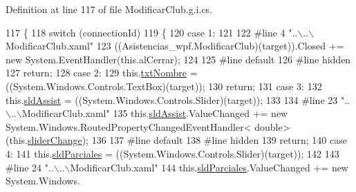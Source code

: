 Definition at line 117 of file Modificar\-Club.\-g.\-i.\-cs.


\begin{DoxyCode}
117                                                                                                 \{
118             \textcolor{keywordflow}{switch} (connectionId)
119             \{
120             \textcolor{keywordflow}{case} 1:
121             
122 \textcolor{preprocessor}{            #line 4 "..\(\backslash\)..\(\backslash\)ModificarClub.xaml"}
123 \textcolor{preprocessor}{}            ((Asistencias\_wpf.ModificarClub)(target)).Closed += \textcolor{keyword}{new} System.EventHandler(\textcolor{keyword}{this}.alCerrar);
124             
125 \textcolor{preprocessor}{            #line default}
126 \textcolor{preprocessor}{}\textcolor{preprocessor}{            #line hidden}
127 \textcolor{preprocessor}{}            \textcolor{keywordflow}{return};
128             \textcolor{keywordflow}{case} 2:
129             this.\hyperlink{class_asistencias__wpf_1_1_modificar_club_aefec4cf6adde6b83050acc590661f212}{txtNombre} = ((System.Windows.Controls.TextBox)(target));
130             \textcolor{keywordflow}{return};
131             \textcolor{keywordflow}{case} 3:
132             this.\hyperlink{class_asistencias__wpf_1_1_modificar_club_a10b87622ef3fad840bb25827b45b6fc6}{sldAssist} = ((System.Windows.Controls.Slider)(target));
133             
134 \textcolor{preprocessor}{            #line 23 "..\(\backslash\)..\(\backslash\)ModificarClub.xaml"}
135 \textcolor{preprocessor}{}            this.\hyperlink{class_asistencias__wpf_1_1_modificar_club_a10b87622ef3fad840bb25827b45b6fc6}{sldAssist}.ValueChanged += \textcolor{keyword}{new} System.Windows.RoutedPropertyChangedEventHandler<\textcolor{keywordtype}{
      double}>(this.\hyperlink{class_asistencias__wpf_1_1_modificar_club_a16e4ed6700460777f30a494ee9eb0680}{sliderChange});
136             
137 \textcolor{preprocessor}{            #line default}
138 \textcolor{preprocessor}{}\textcolor{preprocessor}{            #line hidden}
139 \textcolor{preprocessor}{}            \textcolor{keywordflow}{return};
140             \textcolor{keywordflow}{case} 4:
141             this.\hyperlink{class_asistencias__wpf_1_1_modificar_club_a8333d2f10cd950124c2de671a73fd288}{sldParciales} = ((System.Windows.Controls.Slider)(target));
142             
143 \textcolor{preprocessor}{            #line 24 "..\(\backslash\)..\(\backslash\)ModificarClub.xaml"}
144 \textcolor{preprocessor}{}            this.\hyperlink{class_asistencias__wpf_1_1_modificar_club_a8333d2f10cd950124c2de671a73fd288}{sldParciales}.ValueChanged += \textcolor{keyword}{new} System.Windows.

\end{DoxyCode}
